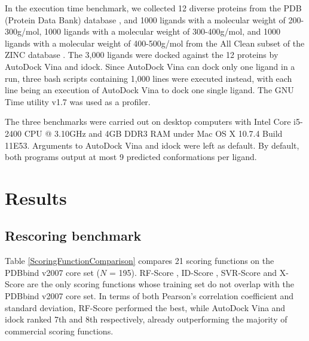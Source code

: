 In the execution time benchmark, we collected 12 diverse proteins from the PDB (Protein Data Bank) database \citep{540,537}, and 1000 ligands with a molecular weight of 200-300g/mol, 1000 ligands with a molecular weight of 300-400g/mol, and 1000 ligands with a molecular weight of 400-500g/mol from the All Clean subset of the ZINC database \citep{532,1178}. The 3,000 ligands were docked against the 12 proteins by AutoDock Vina and idock. Since AutoDock Vina can dock only one ligand in a run, three bash scripts containing 1,000 lines were executed instead, with each line being an execution of AutoDock Vina to dock one single ligand. The GNU Time utility v1.7 was used as a profiler.

The three benchmarks were carried out on desktop computers with Intel Core i5-2400 CPU @ 3.10GHz and 4GB DDR3 RAM under Mac OS X 10.7.4 Build 11E53. Arguments to AutoDock Vina and idock were left as default. By default, both programs output at most 9 predicted conformations per ligand.

\section{Results}

\subsection{Rescoring benchmark}

Table \ref{ScoringFunctionComparison} compares 21 scoring functions on the PDBbind v2007 core set ($N$ = 195). RF-Score \citep{564}, ID-Score \citep{1305}, SVR-Score \citep{1295} and X-Score \citep{573} are the only scoring functions whose training set do not overlap with the PDBbind v2007 core set. In terms of both Pearson's correlation coefficient and standard deviation, RF-Score performed the best, while AutoDock Vina and idock ranked 7th and 8th respectively, already outperforming the majority of commercial scoring functions.


